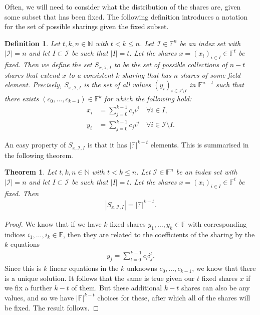 \documentclass{article}
\newtheorem{theorem}{Theorem}
\newtheorem{definition}{Definition}
\theoremstyle{remark}
\newcommand{\N}{\mathbb{N}}
\newcommand{\F}{\mathbb{F}}
\begin{document}
Often, we will need to consider what the distribution of the shares are, given
some subset that has been fixed. The following definition introduces a notation
for the set of possible sharings given the fixed subset.

\newcommand{\shareRestrict}[3]{S_{#1, #2, #3}}

\begin{definition}
	Let $t, k, n \in \N$ with $t < k \le n$. Let $\mathcal{I} \in \F^n$ be an
	index set with $|\mathcal{I}| = n$ and let $I \subset \mathcal{I}$ be such
	that $|I| = t$. Let the shares $x = {(x_i)}_{i \in I} \in \F^t$ be fixed.
	Then we define the set $\shareRestrict{x}{\mathcal{I}}{I}$ to be the set of
	possible collections of $n - t$ shares that extend $x$ to a consistent
	$k$-sharing that has $n$ shares of some field element. Precisely,
	$\shareRestrict{x}{\mathcal{I}}{I}$ is the set of all values ${(y_i)}_{i
	\in \mathcal{I} \setminus I}$ in $\F^{n-t}$ such that there exists $(c_0,
	\ldots, c_{k-1}) \in \F^k$ for which the following hold:
	\begin{align*}
		x_i &= \sum_{j=0}^{k-1} c_j i^j \quad
		\forall i \in I,\\
		y_i &= \sum_{j=0}^{k-1} c_j i^j \quad
		\forall i \in \mathcal{I} \setminus I.
	\end{align*}
\end{definition}

An easy property of $\shareRestrict{x}{\mathcal{I}}{I}$ is that it has
$|\F|^{k-t}$ elements. This is summarised in the following theorem.

\begin{theorem}\label{thm:restrictSize}
	Let $t, k, n \in \N$ with $t < k \le n$. Let $\mathcal{I} \in \F^n$ be an
	index set with $|\mathcal{I}| = n$ and let $I \subset \mathcal{I}$ be such
	that $|I| = t$. Let the shares $x = {(x_i)}_{i \in I} \in \F^t$ be fixed.
	Then
	\begin{align*}
		|\shareRestrict{x}{\mathcal{I}}{I}| = |\F|^{k-t}.
	\end{align*}
\end{theorem}

\begin{proof}
	We know that if we have $k$ fixed shares $y_1, \ldots, y_k \in \F$ with
	corresponding indices $i_1, \ldots, i_k \in \F$, then they are related to
	the coefficients of the sharing by the $k$ equations
	\begin{align*}
		y_j = \sum_{l=0}^{k-1} c_l i_j^l.
	\end{align*}
	Since this is $k$ linear equations in the $k$ unknowns $c_0, \ldots,
	c_{k-1}$, we know that there is a unique solution. It follows that the same
	is true given our $t$ fixed shares $x$ if we fix a further $k-t$ of them.
	But these additional $k - t$ shares can also be any values, and so we have
	$|\F|^{k-t}$ choices for these, after which all of the shares will be
	fixed. The result follows.
\end{proof}
\end{document}
